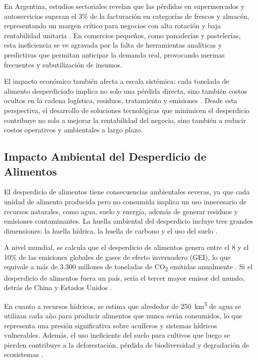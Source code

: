 En Argentina, estudios sectoriales revelan que las pérdidas en supermercados y autoservicios superan el 3\% de la facturación en categorías de frescos y almacén, representando un margen crítico para negocios con alta rotación y baja rentabilidad unitaria \parencite{weteam2021}. En comercios pequeños, como panaderías y pastelerías, esta ineficiencia se ve agravada por la falta de herramientas analíticas y predictivas que permitan anticipar la demanda real, provocando mermas frecuentes y subutilización de insumos.

El impacto económico también afecta a escala sistémica: cada tonelada de alimento desperdiciado implica no solo una pérdida directa, sino también costos ocultos en la cadena logística, residuos, tratamiento y emisiones \parencite{refed2016}. Desde esta perspectiva, el desarrollo de soluciones tecnológicas que minimicen el desperdicio contribuye no solo a mejorar la rentabilidad del negocio, sino también a reducir costos operativos y ambientales a largo plazo.

\subsection{Impacto Ambiental del Desperdicio de Alimentos}

El desperdicio de alimentos tiene consecuencias ambientales severas, ya que cada unidad de alimento producida pero no consumida implica un uso innecesario de recursos naturales, como agua, suelo y energía, además de generar residuos y emisiones contaminantes. La huella ambiental del desperdicio incluye tres grandes dimensiones: la huella hídrica, la huella de carbono y el uso del suelo \parencite{fao2013}.

A nivel mundial, se calcula que el desperdicio de alimentos genera entre el 8 y el 10\% de las emisiones globales de gases de efecto invernadero (GEI), lo que equivale a más de 3.300 millones de toneladas de CO\textsubscript{2} emitidas anualmente \parencite{unep2021}. Si el desperdicio de alimentos fuera un país, sería el tercer mayor emisor del mundo, detrás de China y Estados Unidos \parencite{fao2013}.

En cuanto a recursos hídricos, se estima que alrededor de 250~km\textsuperscript{3} de agua se utilizan cada año para producir alimentos que nunca serán consumidos, lo que representa una presión significativa sobre acuíferos y sistemas hídricos vulnerables. Además, el uso ineficiente del suelo para cultivos que luego se pierden contribuye a la deforestación, pérdida de biodiversidad y degradación de ecosistemas \parencite{kummu2012}.

